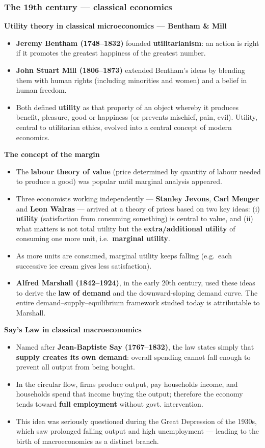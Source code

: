 \subsubsection*{The 19th century --- classical economics}
\textbf{Utility theory in classical microeconomics --- Bentham \& Mill}
\begin{itemize}
  \item \textbf{Jeremy Bentham (1748--1832)} founded \textbf{utilitarianism}: an action is right if it promotes the greatest happiness of the greatest number.
  \item \textbf{John Stuart Mill (1806--1873)} extended Bentham's ideas by blending them with human rights (including minorities and women) and a belief in human freedom.
  \item Both defined \textbf{utility} as that property of an object whereby it produces benefit, pleasure, good or happiness (or prevents mischief, pain, evil). Utility, central to utilitarian ethics, evolved into a central concept of modern economics.
\end{itemize}
\textbf{The concept of the margin}
\begin{itemize}
  \item The \textbf{labour theory of value} (price determined by quantity of labour needed to produce a good) was popular until marginal analysis appeared.
  \item Three economists working independently --- \textbf{Stanley Jevons}, \textbf{Carl Menger} and \textbf{Leon Walras} --- arrived at a theory of prices based on two key ideas: (i) \textbf{utility} (satisfaction from consuming something) is central to value, and (ii) what matters is not total utility but the \textbf{extra/additional utility} of consuming one more unit, i.e.\ \textbf{marginal utility}.
  \item As more units are consumed, marginal utility keeps falling (e.g.\ each successive ice cream gives less satisfaction).
  \item \textbf{Alfred Marshall (1842--1924)}, in the early 20th century, used these ideas to derive the \textbf{law of demand} and the downward-sloping demand curve. The entire demand--supply--equilibrium framework studied today is attributable to Marshall.
\end{itemize}
\textbf{Say's Law in classical macroeconomics}
\begin{itemize}
  \item Named after \textbf{Jean-Baptiste Say (1767--1832)}, the law states simply that \textbf{supply creates its own demand}: overall spending cannot fall enough to prevent all output from being bought.
  \item In the circular flow, firms produce output, pay households income, and households spend that income buying the output; therefore the economy tends toward \textbf{full employment} without govt. intervention.
  \item This idea was seriously questioned during the Great Depression of the 1930s, which saw prolonged falling output and high unemployment --- leading to the birth of macroeconomics as a distinct branch.
\end{itemize}
